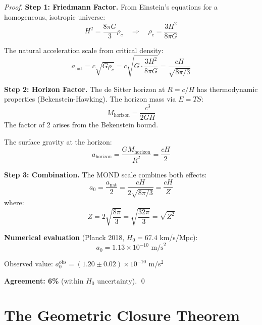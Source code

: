 \documentclass[twocolumn,showpacs,preprintnumbers,amsmath,amssymb,prd]{revtex4-2}
\begin{document}
\begin{proof}
\textbf{Step 1: Friedmann Factor.}
From Einstein's equations for a homogeneous, isotropic universe:
\begin{equation}
H^2 = \frac{8\pi G}{3}\rho_c \quad \Rightarrow \quad \rho_c = \frac{3H^2}{8\pi G}
\end{equation}

The natural acceleration scale from critical density:
\begin{equation}
a_{\text{nat}} = c\sqrt{G\rho_c} = c\sqrt{G \cdot \frac{3H^2}{8\pi G}} = \frac{cH}{\sqrt{8\pi/3}}
\end{equation}

\textbf{Step 2: Horizon Factor.}
The de Sitter horizon at $R = c/H$ has thermodynamic properties (Bekenstein-Hawking). The horizon mass via $E = TS$:
\begin{equation}
M_{\text{horizon}} = \frac{c^3}{2GH}
\end{equation}
The factor of 2 arises from the Bekenstein bound.

The surface gravity at the horizon:
\begin{equation}
a_{\text{horizon}} = \frac{GM_{\text{horizon}}}{R^2} = \frac{cH}{2}
\end{equation}

\textbf{Step 3: Combination.}
The MOND scale combines both effects:
\begin{equation}
a_0 = \frac{a_{\text{nat}}}{2} = \frac{cH}{2\sqrt{8\pi/3}} = \frac{cH}{Z}
\end{equation}
where:
\begin{equation}
Z = 2\sqrt{\frac{8\pi}{3}} = \sqrt{\frac{32\pi}{3}} = \sqrt{Z^2}
\end{equation}

\textbf{Numerical evaluation} (Planck 2018, $H_0 = 67.4$ km/s/Mpc):
\begin{equation}
a_0 = 1.13 \times 10^{-10} \text{ m/s}^2
\end{equation}

Observed value: $a_0^{\text{obs}} = (1.20 \pm 0.02) \times 10^{-10}$ m/s$^2$

\textbf{Agreement: 6\%} (within $H_0$ uncertainty). \qed
\end{proof}

\section{The Geometric Closure Theorem}
\end{document}
